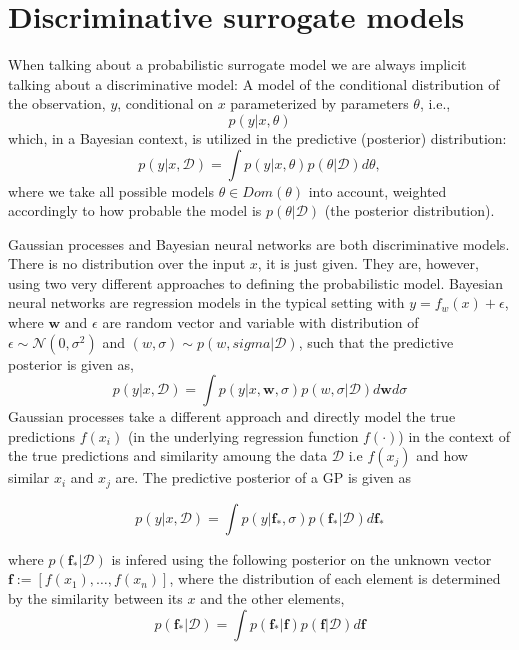 \chapter{Discriminative surrogate models}

When talking about a probabilistic surrogate model we are always implicit talking about a
discriminative model: A model of the conditional distribution of the observation, $y$, 
conditional on $x$ parameterized by parameters $\theta$, i.e., 
$$p(y|x, \theta)$$ 
which, in a Bayesian context, is utilized in the predictive (posterior)
distribution:
$$p(y|x,\mathcal{D}) = \int p(y|x, \theta)p(\theta|\mathcal{D}) d\theta,$$ where we take all
possible models $\theta \in Dom(\theta)$ into account, weighted accordingly to how probable the
model is $p(\theta|\mathcal{D})$ (the posterior distribution). 

Gaussian processes and Bayesian neural networks are both discriminative models. There is no
distribution over the input $x$, it is just given. They are, however, using two very different
approaches to defining the probabilistic model. Bayesian neural networks are regression models in
the typical setting with $y=f_w(x)+\epsilon$, where $\textbf{w}$ and $\epsilon$ are random vector and variable
with distribution of $\epsilon \sim \mathcal{N}(0,\sigma^2)$ and $(w, \sigma) \sim p(w, sigma | \mathcal{D})$, 
such that the predictive posterior is given as, 
$$ p(y|x,\mathcal{D}) = \int p(y|x, \textbf{w},\sigma)p(w,\sigma|\mathcal{D}) d \textbf{w}
d\sigma$$ Gaussian processes take a different approach and directly model the true predictions
$f(x_i)$ (in the underlying regression function $f(\cdot)$) in the context of the true predictions
and similarity amoung the data $\mathcal{D}$ i.e $f(x_j)$ and how similar $x_i$ and $x_j$ are. 
The predictive posterior of a GP is given as

$$ p(y|x,\mathcal{D}) = \int p(y|\textbf{f}_*, \sigma) p(\textbf{f}_*|\mathcal{D}) d \textbf{f}_*$$

where $p(\textbf{f}_*|\mathcal{D})$ is infered using the following posterior on the unknown vector $\textbf{f} :=
[f(x_1),\dots,f(x_n)]$, where the distribution of each element is determined by the similarity between its $x$
and the other elements,  
$$p(\textbf{f}_*|\mathcal{D}) = \int p(\textbf{f}_*|\textbf{f})p(\textbf{f}|\mathcal{D}) d \textbf{f}$$

